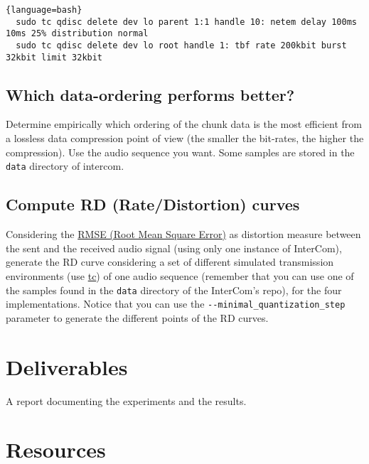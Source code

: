 \begin{lstlisting}{language=bash}
  sudo tc qdisc delete dev lo parent 1:1 handle 10: netem delay 100ms 10ms 25% distribution normal
  sudo tc qdisc delete dev lo root handle 1: tbf rate 200kbit burst 32kbit limit 32kbit
\end{lstlisting}

\subsection{Which data-ordering performs better?}
Determine empirically which ordering of the chunk data is the most
efficient from a lossless data compression point of view (the smaller
the bit-rates, the higher the compression). Use the audio sequence you
want. Some samples are stored in the \verb|data| directory of
intercom.

\subsection{Compute RD (Rate/Distortion) curves}
Considering the
\href{https://en.wikipedia.org/wiki/Root-mean-square_deviation}{RMSE
  (Root Mean Square Error)} as distortion measure between the sent and
the received audio signal (using only one instance of InterCom),
generate the RD curve considering a set of different simulated
transmission environments (use
\href{https://man7.org/linux/man-pages/man8/tc.8.html}{tc}) of one
audio sequence (remember that you can use one of the samples found in
the \verb|data| directory of the InterCom's repo), for the four
implementations. Notice that you can use the
\verb|--minimal_quantization_step| parameter to generate the different
points of the RD curves.


\section{Deliverables}

A report documenting the experiments and the results.

\section{Resources}


